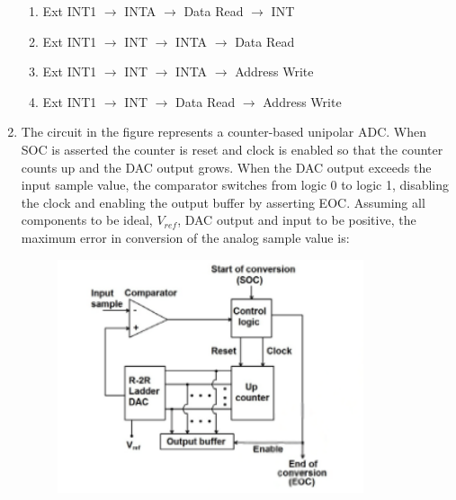 \documentclass[journal,12pt,onecolumn]{IEEEtran}
\theoremstyle{remark}
\begin{document}
\begin{enumerate}
    \hfill{}
    \begin{enumerate}
        \item Ext INT1 $\rightarrow$ INTA $\rightarrow$ Data Read $\rightarrow$ INT
        \item Ext INT1 $\rightarrow$ INT $\rightarrow$ INTA $\rightarrow$ Data Read
        \item Ext INT1 $\rightarrow$ INT $\rightarrow$ INTA $\rightarrow$ Address Write
        \item Ext INT1 $\rightarrow$ INT $\rightarrow$ Data Read $\rightarrow$ Address Write
    \end{enumerate}

    

    \item The circuit in the figure represents a counter-based unipolar ADC. When SOC is asserted the counter is reset and clock is enabled so that the counter counts up and the DAC output grows. When the DAC output exceeds the input sample value, the comparator switches from logic 0 to logic 1, disabling the clock and enabling the output buffer by asserting EOC. Assuming all components to be ideal, $V_{ref}$, DAC output and input to be positive, the maximum error in conversion of the analog sample value is:
    \begin{figure}[H]
        \centering
        \includegraphics[width=0.6\columnwidth]{q43}
        \caption*{}
        \label{fig:q43}
    \end{figure}

    \hfill{}
    \begin{enumerate}
    \end{enumerate}


\end{enumerate}
\end{document}
